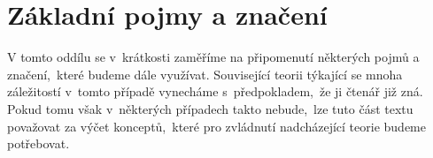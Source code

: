 \section{Základní pojmy a značení}\label{sec:zakladni-pojmy-a-znaceni}

V tomto oddílu se v~krátkosti zaměříme na připomenutí některých pojmů a značení,~které budeme dále využívat. Související teorii týkající se mnoha záležitostí v~tomto případě vynecháme s~předpokladem,~že ji čtenář již zná. Pokud tomu však v~některých případech takto nebude,~lze tuto část textu považovat za výčet konceptů,~které pro zvládnutí nadcházející teorie budeme potřebovat.

